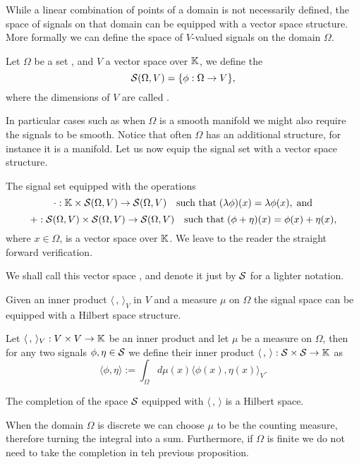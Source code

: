 \documentclass[../3.tex]{subfiles}
\begin{document}
    While a linear combination of points of a domain is not necessarily defined, the space of signals on that domain can be equipped with a vector space
    structure. More formally we can define the space of $V$-valued signals on the domain $\Omega$.

    \begin{defn}
        Let $\Omega$ be a set
        , and $V$ a vector space over $\mathbb{K}$, we define the 
        \[ \mathcal{S}(\Omega,V) = \{ \phi : \Omega \to V \}, \]
        where the dimensions of $V$ are called .
    \end{defn}

    In particular cases such as when $\Omega$ is a smooth manifold we might also require the signals to be smooth.
    Notice that often $\Omega$ has an additional structure, for instance it is a manifold.
    Let us now equip the signal set with a vector space structure.

    The signal set equipped with the operations
    \[ \cdot : \mathbb{K} \times \mathcal{S}(\Omega,V) \to \mathcal{S}(\Omega,V)   \quad \text{such that} \; (\lambda \phi)(x) = \lambda \phi(x), \; \text{and} \]
    \[ + : \mathcal{S}(\Omega,V) \times \mathcal{S}(\Omega,V) \to \mathcal{S}(\Omega,V) \quad \text{such that} \; (\phi + \eta)(x) = \phi(x) + \eta(x), \]
    where $x \in \Omega$, is a vector space over $\mathbb{K}$. We leave to the reader the straight forward verification.


    We shall call this vector space , and denote it just by $\mathcal{S}$ for
    a lighter notation.

    Given an inner product $\langle \, , \, \rangle_V$ in $V$ and a measure $\mu$ on $\Omega$ the signal space can be equipped with a Hilbert space structure.

    \begin{defn}
        Let $\langle \, , \, \rangle_V : V \times V \to \mathbb{K}$ be an inner product and let $\mu$ be a measure on $\Omega$, then for any two signals
        $\phi, \eta \in \mathcal{S}$ we define their inner product $\langle \, , \, \rangle : \mathcal{S} \times \mathcal{S} \to \mathbb{K}$ as
        \[ \langle \phi, \eta \rangle := \int_\Omega d\mu(x) \langle \phi(x), \eta(x) \rangle_V .\]
    \end{defn}

    \begin{prop}
        The completion of the space $\mathcal{S}$ equipped with $\langle \, , \, \rangle$ is a Hilbert space.
    \end{prop}

    \begin{rem}
        When the domain $\Omega$ is discrete we can choose $\mu$ to be the counting measure, therefore turning the integral into a sum.
        Furthermore, if $\Omega$ is finite we do not need to take the completion in teh previous proposition.
    \end{rem}
\end{document}
